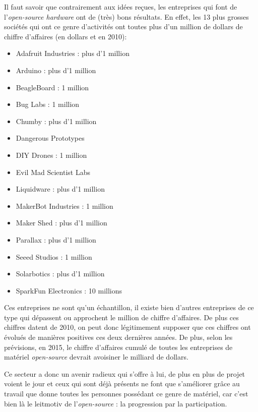 Il faut savoir que contrairement aux idées reçues, les entreprises qui font de l'\textit{open-source hardware} ont de (très) bons résultats. En effet, les 13 plus grosses sociétés qui ont ce genre d'activités ont toutes plus d'un million de dollars de chiffre d'affaires (en dollars et en 2010)\cite{TORRONE_FRIED}:
 \begin{itemize}
 \item Adafruit Industries : plus d'1 million
 \item Arduino : plus d'1 million
 \item BeagleBoard : 1 million
 \item Bug Labs : 1 million
 \item Chumby : plus d'1 million
 \item Dangerous Prototypes
 \item DIY Drones : 1 million
 \item Evil Mad Scientist  Labs
 \item Liquidware : plus d'1 million
 \item MakerBot Industries : 1 million
 \item Maker Shed : plus d'1 million
 \item Parallax : plus d'1 million
 \item Seeed Studios : 1 million
 \item Solarbotics : plus d'1 million
 \item SparkFun Electronics : 10 millions
 \end{itemize}  
Ces entreprises ne sont qu'un échantillon, il existe bien d'autres entreprises de ce type qui dépassent ou approchent le million de chiffre d'affaires. De plus ces chiffres datent de 2010, on peut donc légitimement supposer que ces chiffres ont évolués de manières positives ces deux dernières années. De plus, selon les prévisions, en 2015, le chiffre d'affaires cumulé de toutes les entreprises de matériel \textit{open-source} devrait avoisiner le milliard de dollars.

Ce secteur a donc un avenir radieux qui s'offre à lui, de plus en plus de projet voient le jour et ceux qui sont déjà présents ne font que s'améliorer grâce au travail que donne toutes les personnes possédant ce genre de matériel, car c'est bien là le leitmotiv de l'\textit{open-source} : la progression par la participation.
